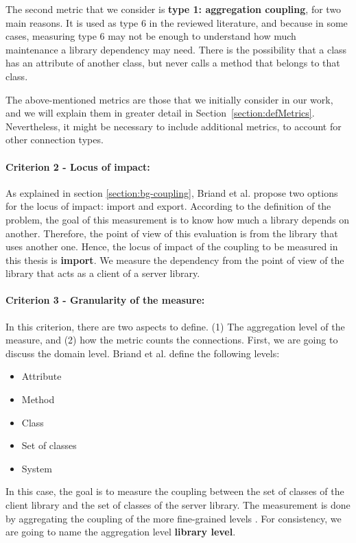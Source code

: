 The second metric that we consider is \textbf{type 1: aggregation coupling}, for two main reasons. It is used as type 6 in the reviewed literature, and because in some cases, measuring type 6 may not be enough to understand how much maintenance a library dependency may need. There is the possibility that a class has an attribute of another class, but never calls a method that belongs to that class.

The above-mentioned metrics are those that we initially consider in our work, and we will explain them in greater detail in Section~\ref{section:defMetrics}. Nevertheless, it might be necessary to include additional metrics, to account for other connection types.

\paragraph{Criterion 2 - Locus of impact:}
As explained in section \ref{section:bg-coupling}, Briand et al. propose two options for the locus of impact: import and export. According to the definition of the problem, the goal of this measurement is to know how much a library depends on another. Therefore, the point of view of this evaluation is from the library that uses another one. Hence, the locus of impact of the coupling to be measured in this thesis is \textbf{import}. We measure the dependency from the point of view of the library that acts as a client of a server library.

\paragraph{Criterion 3 - Granularity of the measure:}
In this criterion, there are two aspects to define. (1) The aggregation level of the measure, and (2) how the metric counts the connections. First, we are going to discuss the domain level. Briand et al. define the following levels:

\begin{itemize}[noitemsep]
  \renewcommand\labelitemi{--}
  \item Attribute
  \item Method
  \item Class
  \item Set of classes
  \item System
\end{itemize}

\blankls
In this case, the goal is to measure the coupling between the set of classes of the client library and the set of classes of the server library. The measurement is done by aggregating the coupling of the more fine-grained levels \cite{briand1999unified}. For consistency, we are going to name the aggregation level \textbf{library level}.

